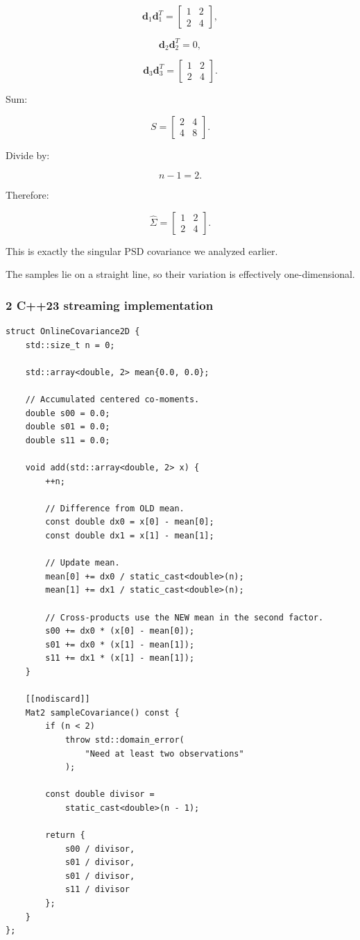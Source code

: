 \[
 \mathbf d_1\mathbf d_1^T= \begin{bmatrix}1&2\\2&4\end{bmatrix},
\]

\[
 \mathbf d_2\mathbf d_2^T=0,
\]

\[
 \mathbf d_3\mathbf d_3^T= \begin{bmatrix}1&2\\2&4\end{bmatrix}.
\]

Sum:

\[
 S= \begin{bmatrix} 2&4\\4&8 \end{bmatrix}.
\]

Divide by:

\[
 n-1=2.
\]

Therefore:

\[
 \boxed{ \widehat\Sigma= \begin{bmatrix} 1&2\\ 2&4 \end{bmatrix} }.
\]

This is exactly the singular PSD covariance we analyzed earlier.

The samples lie on a straight line, so their variation is effectively one-dimensional.

\subsubsection{2 C++23 streaming implementation}\label{02-foundations-ii-ch031-c23-streaming-implementation}

\begin{verbatim}
struct OnlineCovariance2D {
    std::size_t n = 0;

    std::array<double, 2> mean{0.0, 0.0};

    // Accumulated centered co-moments.
    double s00 = 0.0;
    double s01 = 0.0;
    double s11 = 0.0;

    void add(std::array<double, 2> x) {
        ++n;

        // Difference from OLD mean.
        const double dx0 = x[0] - mean[0];
        const double dx1 = x[1] - mean[1];

        // Update mean.
        mean[0] += dx0 / static_cast<double>(n);
        mean[1] += dx1 / static_cast<double>(n);

        // Cross-products use the NEW mean in the second factor.
        s00 += dx0 * (x[0] - mean[0]);
        s01 += dx0 * (x[1] - mean[1]);
        s11 += dx1 * (x[1] - mean[1]);
    }

    [[nodiscard]]
    Mat2 sampleCovariance() const {
        if (n < 2)
            throw std::domain_error(
                "Need at least two observations"
            );

        const double divisor =
            static_cast<double>(n - 1);

        return {
            s00 / divisor,
            s01 / divisor,
            s01 / divisor,
            s11 / divisor
        };
    }
};
\end{verbatim}


